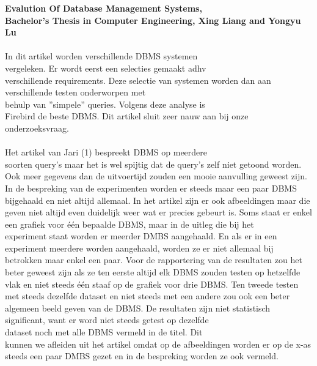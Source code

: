 \documentclass[fleqn,10pt]{artikeltin}
\begin{document}
\textbf{Evalution Of Database Management Systems, \\Bachelor's Thesis in Computer Engineering, Xing Liang and Yongyu Lu}\\\\
In dit artikel worden verschillende DBMS systemen \\vergeleken. Er wordt eerst een selecties gemaakt adhv \\verschillende requirements. Deze selectie van systemen worden dan aan verschillende testen onderworpen met \\behulp van ''simpele'' queries. Volgens deze analyse is \\Firebird de beste DBMS. Dit artikel sluit zeer nauw aan bij onze onderzoeksvraag.\\\\
Het artikel van Jari (1) bespreekt DBMS op meerdere \\soorten query’s maar het is wel spijtig dat de query’s zelf niet getoond worden. Ook meer gegevens dan de uitvoertijd zouden een mooie aanvulling geweest zijn. In de bespreking van de experimenten worden er steeds maar een paar DBMS bijgehaald en niet altijd allemaal. In het artikel zijn er ook afbeeldingen maar die geven niet altijd even duidelijk weer wat er precies gebeurt is. Soms staat er enkel een grafiek voor één bepaalde DBMS, maar in de uitleg die bij het \\experiment staat worden er meerder DMBS aangehaald. En als er in een experiment meerdere worden aangehaald, worden ze er niet allemaal bij betrokken maar enkel een paar. Voor de rapportering van de resultaten zou het beter geweest zijn als ze ten eerste altijd elk DBMS zouden testen op hetzelfde vlak en niet steeds één staaf op de grafiek voor drie DBMS. Ten tweede testen met steeds dezelfde dataset en niet steeds met een andere zou ook een beter algemeen beeld geven van de DBMS. De resultaten zijn niet statistisch significant, want er word niet steeds getest op dezelfde \\dataset noch met alle DBMS vermeld in de titel. Dit \\kunnen we afleiden uit het artikel omdat op de afbeeldingen worden er op de x-as steeds een paar DMBS gezet en in de bespreking worden ze ook vermeld.\\\\
\end{document}
